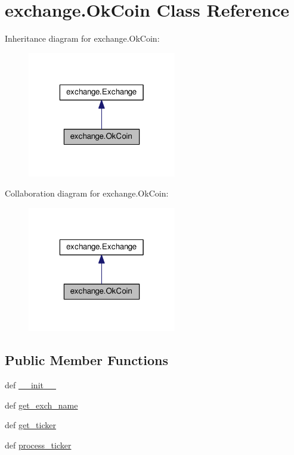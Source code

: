 \hypertarget{classexchange_1_1_ok_coin}{\section{exchange.\-Ok\-Coin Class Reference}
\label{classexchange_1_1_ok_coin}
}


Inheritance diagram for exchange.\-Ok\-Coin\-:
\nopagebreak
\begin{figure}[H]
\begin{center}
\leavevmode
\includegraphics[width=184pt]{classexchange_1_1_ok_coin__inherit__graph}
\end{center}
\end{figure}


Collaboration diagram for exchange.\-Ok\-Coin\-:
\nopagebreak
\begin{figure}[H]
\begin{center}
\leavevmode
\includegraphics[width=184pt]{classexchange_1_1_ok_coin__coll__graph}
\end{center}
\end{figure}
\subsection*{Public Member Functions}
\begin{DoxyCompactItemize}
\item 
def \hyperlink{classexchange_1_1_ok_coin_a2df16234d373d0ac04a019917e612b70}{\-\_\-\-\_\-init\-\_\-\-\_\-}
\item 
def \hyperlink{classexchange_1_1_ok_coin_a563fd2032e890cb41592fad56ddf704e}{get\-\_\-exch\-\_\-name}
\item 
def \hyperlink{classexchange_1_1_ok_coin_ae4fed29a4c9e9466849b05f4c0537eba}{get\-\_\-ticker}
\item 
def \hyperlink{classexchange_1_1_ok_coin_a68de0ed0c8e15df62ee3c116127d960b}{process\-\_\-ticker}
\end{DoxyCompactItemize}
